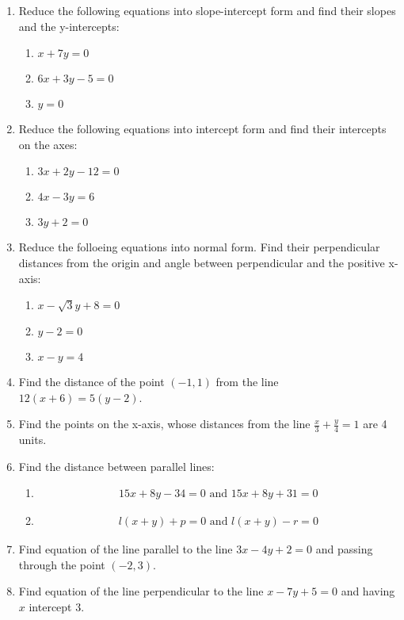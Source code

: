 \begin{enumerate}
\item Reduce the following equations into slope-intercept form and find their slopes and the y-intercepts:
\begin{enumerate}[label=(\roman*)]
\item $x+7y=0$
\item $6x+3y-5=0$
\item $y=0$
\end{enumerate}
\item Reduce the following equations into intercept form and find their intercepts on the axes:
\begin{enumerate}[label=(\roman*)]
\item $3x+2y-12=0$
\item $4x-3y=6$
\item $3y+2=0$
\end{enumerate}
\item Reduce the folloeing equations into normal form. Find their perpendicular distances from the origin and angle between perpendicular and the positive x-axis:
\begin{enumerate}[label=(\roman*)]
\item $x-\sqrt3y+8=0$
\item $y-2=0$
\item $x-y=4$
\end{enumerate}
\item Find the distance of the point $(-1,1)$ from the line $12(x+6)=5(y-2)$.
\item Find the points on the x-axis, whose distances from the line $\frac{x}{3}+\frac{y}{4}=1$ are 4 units.
\item Find the distance between parallel lines:
\begin{enumerate}[label=(\roman*)]
           \item
 \begin{align}
        15x+8y-34=0 \text{ and } 15x+8y+31=0
              \end{align}
            \item
\begin{align}
        l(x+y)+p=0 \text{ and } l(x+y)-r=0
              \end{align}
\end{enumerate}
\item Find equation of the line parallel to the line $3x-4y+2=0$ and passing through the point $(-2,3)$.
\item Find equation of the line perpendicular to the line $x-7y+5=0$ and having $x$ intercept $3$.

\end{enumerate}
